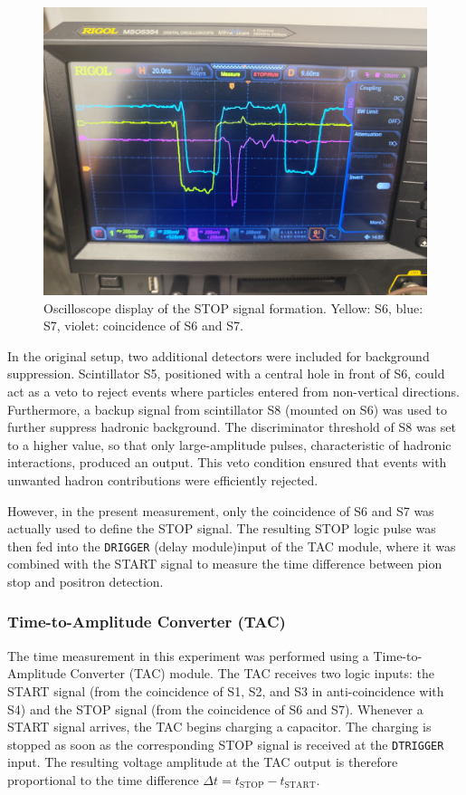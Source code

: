 \documentclass[11pt,a4paper]{article}
\begin{document}
\begin{figure}[h]
\centering
\includegraphics[width=0.48\linewidth]{S6S7.jpg}
\caption{Oscilloscope display of the STOP signal formation. Yellow: S6, blue: S7, violet: coincidence of S6 and S7.}
\label{STOPscope}
\end{figure}

In the original setup, two additional detectors were included for background suppression. Scintillator S5, positioned with a central hole in front of S6, could act as a veto to reject events where particles entered from non-vertical directions. Furthermore, a backup signal from scintillator S8 (mounted on S6) was used to further suppress hadronic background. The discriminator threshold of S8 was set to a higher value, so that only large-amplitude pulses, characteristic of hadronic interactions, produced an output. This veto condition ensured that events with unwanted hadron contributions were efficiently rejected.

However, in the present measurement, only the coincidence of S6 and S7 was actually used to define the STOP signal.
The resulting STOP logic pulse was then fed into the \texttt{DRIGGER} (delay module)input of the TAC module,
where it was combined with the START signal to measure the time difference between pion stop and positron detection.

\subsubsection{Time-to-Amplitude Converter (TAC)}

The time measurement in this experiment was performed using a Time-to-Amplitude Converter (TAC) module.
The TAC receives two logic inputs: the START signal (from the coincidence of S1, S2, and S3 in anti-coincidence with S4)
and the STOP signal (from the coincidence of S6 and S7).
Whenever a START signal arrives, the TAC begins charging a capacitor.
The charging is stopped as soon as the corresponding STOP signal is received at the \texttt{DTRIGGER} input.
The resulting voltage amplitude at the TAC output is therefore proportional to the time difference $\Delta t = t_{\text{STOP}} - t_{\text{START}}$.
\end{document}
